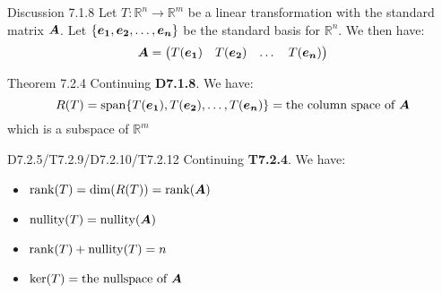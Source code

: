 \documentclass[10pt,portrait]{article}
\begin{document}
\begin{multicols}{2}
\begin{justifying}
\begin{namedthm*}{Discussion 7.1.8}
	Let \(T: \mathbb{R}^n \rightarrow \mathbb{R}^m\) be a linear transformation with the standard matrix \(\bm{A}\). Let \(\{\bm{e_1}, \bm{e_2}, \dots, \bm{e_n}\}\) be the standard basis for \(\mathbb{R}^n\). We then have:
    \[
        \bm{A} = 
        \begin{pmatrix}
        T(\bm{e_1}) & T(\bm{e_2}) & \dots & T(\bm{e_n})
        \end{pmatrix}
    \]
\end{namedthm*}

\begin{namedthm*}{Theorem 7.2.4}
	Continuing \textbf{D7.1.8}. We have:
	\[
	    R(T) = \operatorname{span}\{T(\bm{e_1}), T(\bm{e_2}), \dots, T(\bm{e_n})\} = \text{the column space of }\bm{A}
	\]
	which is a subspace of \(\mathbb{R}^m\)
\end{namedthm*}

\begin{namedthm*}{D7.2.5/T7.2.9/D7.2.10/T7.2.12}
	Continuing \textbf{T7.2.4}. We have:
	\begin{itemize}
		\item \(\rank(T) = \dim(R(T)) = \rank(\bm{A})\)
		\item \(\operatorname{nullity}(T) = \operatorname{nullity}(\bm{A})\)
		\item \(\rank(T) + \operatorname{nullity}(T) = n\)
		\item \(\ker(T) = \text{the nullspace of }\bm{A}\)
	\end{itemize}
\end{namedthm*}
\end{justifying}
\end{multicols}
\end{document}
